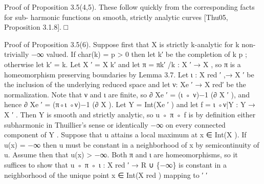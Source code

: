 \documentclass[
  10pt,
]{article}
\newenvironment{Shaded}{}{}
\newcommand{\NormalTok}[1]{#1}
\begin{document}
\begin{Shaded}
\begin{Highlighting}[]
\NormalTok{Proof of Proposition 3.5(4,5). These follow quickly from the corresponding facts for sub{-}}
\NormalTok{harmonic functions on smooth, strictly analytic curves [Thu05, Proposition 3.1.8].     □}

\NormalTok{Proof of Proposition 3.5(6). Suppose first that X is strictly k{-}analytic for k non{-}trivially}
\NormalTok{                                                                                −∞}
\NormalTok{valued. If char(k) = p \textgreater{} 0 then let k′ be the completion of k p ; otherwise let k′ = k.}
\NormalTok{Let X ′ = X k′ and let π = πk′ /k : X ′ → X , so π is a homeomorphism preserving boundaries}
\NormalTok{by Lemma 3.7. Let ι : X red    ′}
\NormalTok{                                  ,→ X ′ be the inclusion of the underlying reduced space and let}
\NormalTok{ν: Xe ′ → X red′}
\NormalTok{                  be the normalization. Note that ν and ι are finite, so ∂ Xe ′ = (ι ◦ ν)−1 (∂ X ′ ),}
\NormalTok{and hence ∂ Xe ′ = (π◦ι ◦ν)−1 (∂ X ). Let Y = Int(Xe ′ ) and let f = ι ◦ν|Y : Y → X ′ . Then Y is}
\NormalTok{smooth and strictly analytic, so u ◦ π ◦ f is by definition either subharmonic in Thuillier’s}
\NormalTok{sense or identically −∞ on every connected component of Y .}
\NormalTok{   Suppose that u attains a local maximum at x ∈ Int(X ). If u(x) = −∞ then u must}
\NormalTok{be constant in a neighborhood of x by semicontinuity of u. Assume then that u(x) \textgreater{}}
\NormalTok{−∞. Both π and ι are homeomorphisms, so it suffices to show that u ◦ π ◦ ι : X red                 ′}
\NormalTok{                                                                                                      →}
\NormalTok{R ∪ \{−∞\} is constant in a neighborhood of the unique point x ∈ Int(X red ) mapping to}
\NormalTok{                                                                                 ′       ′}


\end{Highlighting}
\end{Shaded}
\end{document}
